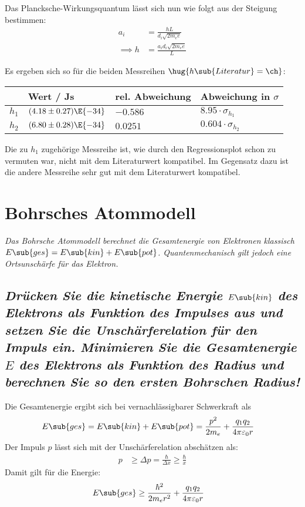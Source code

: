 \documentclass[ex, minted]{exercise_4.0}
\begin{document}
Das Plancksche-Wirkungsquantum lässt sich nun wie folgt aus der Steigung bestimmen:
\begin{align*}
    a_i &= \frac{hL}{d_i\sqrt{2m_e e}}\\
    \implies h &= \frac{a_i d_i\sqrt{2m_e e}}{L}
\end{align*}

Es ergeben sich so für die beiden Messreihen $\hug{h\sub{Literatur} = \ch}$:
\begin{center}
\begin{tabularx}{.8\textwidth}{|c|y|y|y|}
    \hline
    & Wert / Js& rel. Abweichung & Abweichung in $\sigma$\\\hline
    $h_1$ & $(4.18\pm0.27)\E{-34}$ & $-0.586$ & $8.95\cdot\sigma_{h_1}$\\\hline
    $h_2$ & $(6.80\pm0.28)\E{-34}$ & $0.0251$ & $0.604\cdot\sigma_{h_2}$\\\hline
\end{tabularx}
\end{center}\vspace{1ex}

Die zu $h_1$ zugehörige Messreihe ist, wie durch den Regressionsplot schon zu vermuten war, nicht mit dem Literaturwert kompatibel. Im Gegensatz dazu ist die andere Messreihe sehr gut mit dem Literaturwert kompatibel.  


\section{Bohrsches Atommodell}
{\it Das Bohrsche Atommodell berechnet die Gesamtenergie von Elektronen klassisch $E\sub{ges} = E\sub{kin} + E\sub{pot}$. Quantenmechanisch gilt jedoch eine Ortsunschärfe für das Elektron.}

\subsection{\it Drücken Sie die kinetische Energie $E\sub{kin}$ des Elektrons als Funktion des Impulses aus und setzen Sie die Unschärferelation für den Impuls ein. Minimieren Sie die Gesamtenergie $E$ des Elektrons als Funktion des Radius und berechnen Sie so den ersten Bohrschen Radius!}\vspace{1ex}

Die Gesamtenergie ergibt sich bei vernachlässigbarer Schwerkraft als
\begin{align*}
    E\sub{ges} &= E\sub{kin} + E\sub{pot}
    = \frac{p^2}{2m_e} + \frac{q_1 q_2}{4\pi \varepsilon_0 r}
\end{align*}
Der Impuls $p$ lässt sich mit der Unschärferelation abschätzen als:
\begin{align*}
    p &\ge \Delta p = \frac\hbar{\Delta x} \ge \frac\hbar x
\end{align*}
Damit gilt für die Energie:
\begin{align*}
    E\sub{ges} &\ge \frac{\hbar^2}{2m_e r^2} + \frac{q_1 q_2}{4\pi \varepsilon_0 r}
\end{align*}
\end{document}
